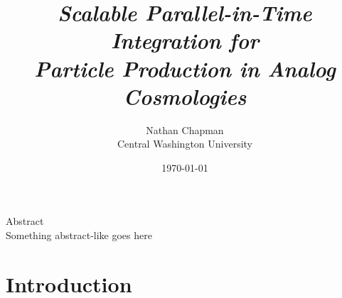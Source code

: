 \documentclass{article}
\title{\Large \vspace{-0.625in} \textit{Scalable Parallel-in-Time Integration for \\ Particle Production in Analog Cosmologies} \vspace{-0.15in}}
\author{Nathan Chapman \vspace{-0.15in}\\ {\normalsize Central Washington University}}
\date{\normalsize \vspace{-0.1in}\today}
\begin{document}
\maketitle

    \begin{center}
    Abstract \\
    Something abstract-like goes here
        
        
        
    \end{center}

\tableofcontents

\pagebreak

\section{Introduction} \label{sec:intro}
\end{document}

